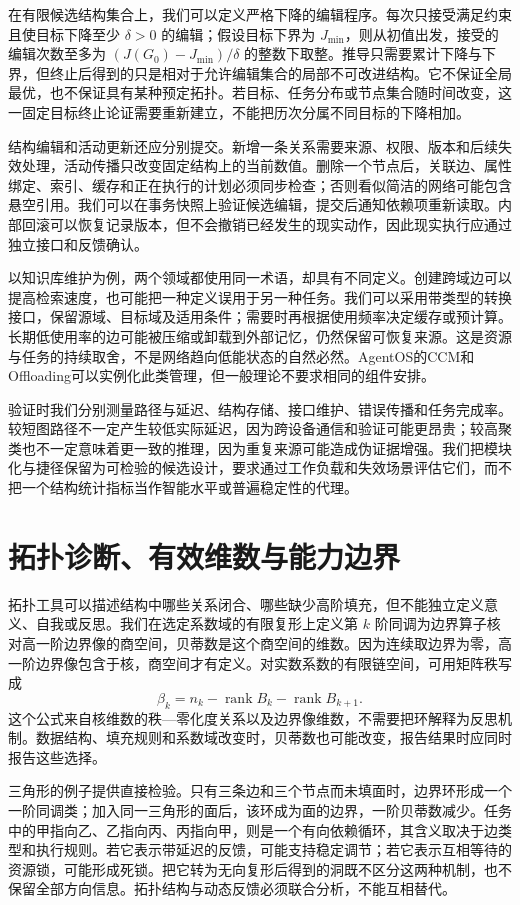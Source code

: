 在有限候选结构集合上，我们可以定义严格下降的编辑程序。每次只接受满足约束且使目标下降至少 $\delta>0$ 的编辑；假设目标下界为 $J_{\min}$，则从初值出发，接受的编辑次数至多为 $(J(G_0)-J_{\min})/\delta$ 的整数下取整。推导只需要累计下降与下界，但终止后得到的只是相对于允许编辑集合的局部不可改进结构。它不保证全局最优，也不保证具有某种预定拓扑。若目标、任务分布或节点集合随时间改变，这一固定目标终止论证需要重新建立，不能把历次分属不同目标的下降相加。

结构编辑和活动更新还应分别提交。新增一条关系需要来源、权限、版本和后续失效处理，活动传播只改变固定结构上的当前数值。删除一个节点后，关联边、属性绑定、索引、缓存和正在执行的计划必须同步检查；否则看似简洁的网络可能包含悬空引用。我们可以在事务快照上验证候选编辑，提交后通知依赖项重新读取。内部回滚可以恢复记录版本，但不会撤销已经发生的现实动作，因此现实执行应通过独立接口和反馈确认。

以知识库维护为例，两个领域都使用同一术语，却具有不同定义。创建跨域边可以提高检索速度，也可能把一种定义误用于另一种任务。我们可以采用带类型的转换接口，保留源域、目标域及适用条件；需要时再根据使用频率决定缓存或预计算。长期低使用率的边可能被压缩或卸载到外部记忆，仍然保留可恢复来源。这是资源与任务的持续取舍，不是网络趋向低能状态的自然必然。AgentOS的CCM和Offloading可以实例化此类管理，但一般理论不要求相同的组件安排。

验证时我们分别测量路径与延迟、结构存储、接口维护、错误传播和任务完成率。较短图路径不一定产生较低实际延迟，因为跨设备通信和验证可能更昂贵；较高聚类也不一定意味着更一致的推理，因为重复来源可能造成伪证据增强。我们把模块化与捷径保留为可检验的候选设计，要求通过工作负载和失效场景评估它们，而不把一个结构统计指标当作智能水平或普遍稳定性的代理。

\section{拓扑诊断、有效维数与能力边界}
\label{sec:section_4716}
\label{sec:section_5497}

拓扑工具可以描述结构中哪些关系闭合、哪些缺少高阶填充，但不能独立定义意义、自我或反思。我们在选定系数域的有限复形上定义第 $k$ 阶同调为边界算子核对高一阶边界像的商空间，贝蒂数是这个商空间的维数。因为连续取边界为零，高一阶边界像包含于核，商空间才有定义。对实数系数的有限链空间，可用矩阵秩写成
\[
 \beta_k=n_k-\operatorname{rank}B_k-\operatorname{rank}B_{k+1}.
\]
这个公式来自核维数的秩—零化度关系以及边界像维数，不需要把环解释为反思机制。数据结构、填充规则和系数域改变时，贝蒂数也可能改变，报告结果时应同时报告这些选择。

三角形的例子提供直接检验。只有三条边和三个节点而未填面时，边界环形成一个一阶同调类；加入同一三角形的面后，该环成为面的边界，一阶贝蒂数减少。任务中的甲指向乙、乙指向丙、丙指向甲，则是一个有向依赖循环，其含义取决于边类型和执行规则。若它表示带延迟的反馈，可能支持稳定调节；若它表示互相等待的资源锁，可能形成死锁。把它转为无向复形后得到的洞既不区分这两种机制，也不保留全部方向信息。拓扑结构与动态反馈必须联合分析，不能互相替代。

